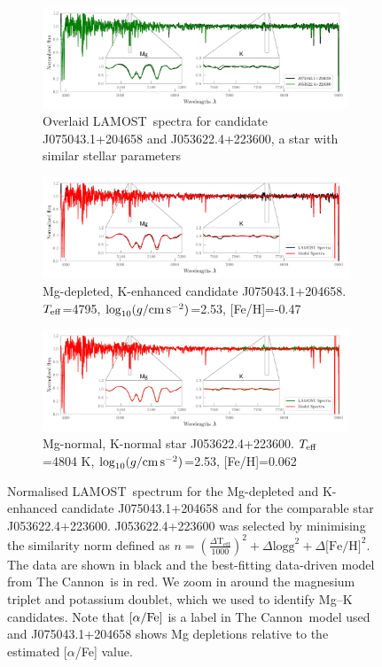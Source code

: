 \documentclass[a4paper,fleqn,usenatbib]{mnras}
\newcommand{\project}[1]{#1}
\newcommand{\lamost}{\project{LAMOST}}
\newcommand{\tc}{\project{The Cannon}}
\newcommand{\teff}{T_{\rm eff}}
\newcommand{\logg}{\log_{10}(g/{\rm cm\,s}^{-2})}
\begin{document}
\begin{figure}
\centering

\begin{subfigure}{1\textwidth}
\centering
\includegraphics[width=\textwidth=1]{similarstarsplot.png}
\caption{Overlaid \lamost\ spectra for candidate J075043.1+204658 and J053622.4+223600, a star with similar stellar parameters}
\end{subfigure}

\begin{subfigure}{1\textwidth}
\centering
\includegraphics[width=\textwidth=1]{posterchild.png}
\caption{Mg-depleted, K-enhanced candidate J075043.1+204658. $\teff$=4795, $\logg$=2.53, [Fe/H]=-0.47}
\end{subfigure}

\begin{subfigure}{1\textwidth}
\centering
\includegraphics[width=\textwidth=1]{postermimic.png}
\caption{Mg-normal, K-normal star J053622.4+223600. $\teff$=4804 K, $\logg$=2.53, [Fe/H]=0.062}
\end{subfigure}

\caption{Normalised \lamost\ spectrum for the Mg-depleted and K-enhanced candidate J075043.1+204658 and for the comparable star J053622.4+223600. J053622.4+223600 was selected by minimising the similarity norm defined as $n=(\frac{\Delta \text{T}_{\text{eff}}}{1000})^2 +\Delta \text{logg} ^2 + \Delta \text{[Fe/H]}^2$. The data are shown in black and the best-fitting data-driven model from \tc\ is in red. We zoom in around the magnesium triplet and potassium doublet, which we used to identify Mg--K candidates. Note that $[\alpha/{\rm Fe}]$ is a label in \tc\ model used and J075043.1+204658 shows Mg depletions relative to the estimated [$\alpha$/Fe] value.}
\label{posterchild}
\end{figure}
\end{document}
